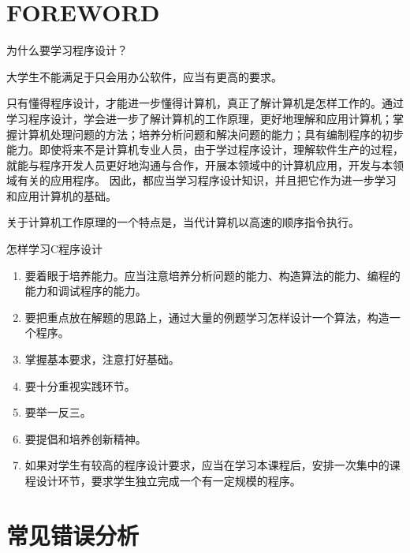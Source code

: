 \chapter{FOREWORD}
为什么要学习程序设计？

大学生不能满足于只会用办公软件，应当有更高的要求。

只有懂得程序设计，才能进一步懂得计算机，真正了解计算机是怎样工作的。通过学习程序设计，学会进一步了解计算机的工作原理，更好地理解和应用计算机；掌握计算机处理问题的方法；培养分析问题和解决问题的能力；具有编制程序的初步能力。即使将来不是计算机专业人员，由于学过程序设计，理解软件生产的过程，就能与程序开发人员更好地沟通与合作，开展本领域中的计算机应用，开发与本领域有关的应用程序。
因此，都应当学习程序设计知识，并且把它作为进一步学习和应用计算机的基础。

关于计算机工作原理的一个特点是，当代计算机以高速的顺序指令执行。

怎样学习C程序设计
\begin{enumerate}
	\item 要着眼于培养能力。应当注意培养分析问题的能力、构造算法的能力、编程的能力和调试程序的能力。
	\item 要把重点放在解题的思路上，通过大量的例题学习怎样设计一个算法，构造一个程序。
	\item 掌握基本要求，注意打好基础。
	\item 要十分重视实践环节。
	\item 要举一反三。
	\item 要提倡和培养创新精神。
	\item 如果对学生有较高的程序设计要求，应当在学习本课程后，安排一次集中的课程设计环节，要求学生独立完成一个有一定规模的程序。
\end{enumerate}

\chapter{常见错误分析}
